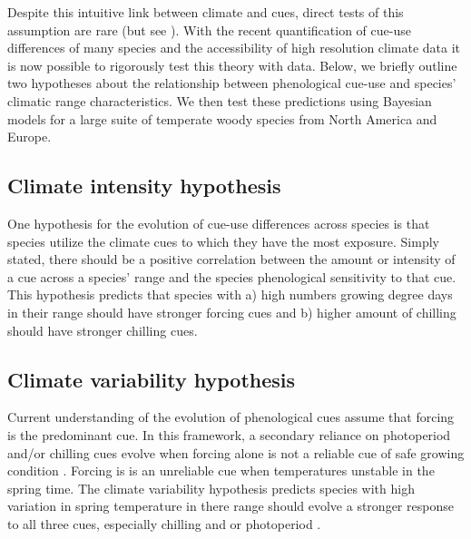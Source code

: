\documentclass[12pt]{article}\usepackage[]{graphicx}\usepackage[]{color}
\begin{document}
Despite this intuitive link between climate and cues, direct tests of this assumption are rare (but see \citep{Zohner:2017aa}). With the recent quantification of cue-use differences of many species \citep{Ettinger:2020aa} and the accessibility of high resolution climate data it is now possible to rigorously test this theory with data. Below, we briefly outline two hypotheses about the relationship between phenological cue-use and species' climatic range characteristics. We then test these predictions using Bayesian models for a large suite of temperate woody species from North America and Europe.

\subsection{Climate intensity hypothesis}
One hypothesis for the evolution of cue-use differences across species is that species utilize the climate cues to which they have the most exposure. Simply stated, there should be a positive correlation between the amount or intensity of a cue across a species' range and the species phenological sensitivity to that cue. This hypothesis predicts that species with  a) high numbers growing degree days in their range should have stronger forcing cues and b) higher amount of chilling should have stronger chilling cues.%

\subsection{Climate variability hypothesis}

Current understanding of the evolution of phenological cues assume that forcing is the predominant cue. In this framework, a secondary reliance on photoperiod and/or chilling cues evolve when forcing alone is not a reliable cue of safe growing condition \citep{Korner:2010aa}. Forcing is is an unreliable cue when temperatures unstable in the spring time. The climate variability hypothesis predicts species with high variation in spring temperature in there range should evolve a stronger response to all three cues, especially chilling and or photoperiod \citep{Wang:2014aa, Muffler2016}. %
\end{document}
